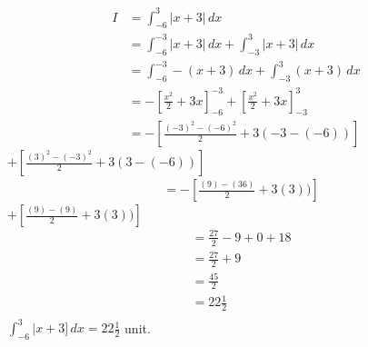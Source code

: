 \documentclass[12pt]{IEEEtran}
\begin{document}
    \begin{align}
        I&=\int_{-6}^{3} |x+3| \,dx \\
        &= \int_{-6}^{-3} |x+3| \,dx  +  \int_{-3}^{3} |x+3| \,dx \\
        &= \int_{-6}^{-3} -(x+3) \,dx  +  \int_{-3}^{3} (x+3) \,dx \\
        &= -\left[\frac{x^2}{2}+3x\right]_{-6}^{-3} + \left[\frac{x^2}{2}+3x\right]_{-3}^{3}\\
        &=-\left[\frac{(-3)^2-(-6)^2}{2}+3(-3-(-6))\right]
    \end{align}
    $+\left[\frac{(3)^2-(-3)^2}{2} +3(3-(-6))\right]$\\
    \begin{align}
        &=-\left[\frac{(9)-(36)}{2} +3(3))\right]
    \end{align}
    $+\left[\frac{(9)-(9)}{2} +3(3))\right]$\\
    \begin{align}
        &=\frac{27}{2}-9+0+18\\
        &=\frac{27}{2}+9\\
        &=\frac{45}{2}\\
        &=22\frac{1}{2}\\
    \end{align}
    \implies$\int_{-6}^{3} |x+3] \,dx = 22\frac{1}{2}$ unit.\\
\end{document}
